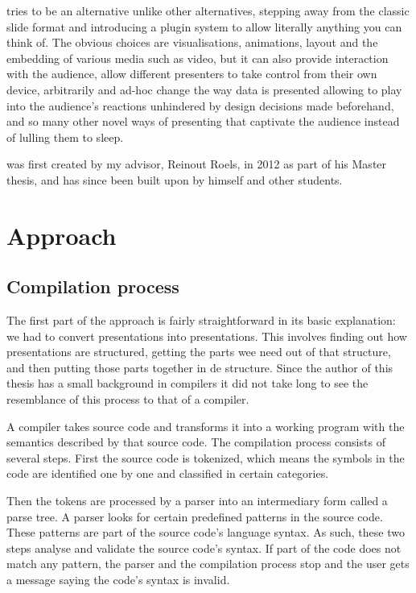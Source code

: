 \documentclass[a4paper,12pt]{report}
\begin{document}


    \mxp tries to be an alternative unlike other alternatives, stepping away
    from the classic slide format and introducing a plugin system to allow
    literally anything you can think of. The obvious choices are
    visualisations, animations, layout and the embedding of various media such
    as video, but it can also provide interaction with the audience, allow
    different presenters to take control from their own device, arbitrarily and
    ad-hoc change the way data is presented allowing to play into the
    audience's reactions unhindered by design decisions made beforehand, and so
    many other novel ways of presenting that captivate the audience instead of
    lulling them to sleep.

    \mxp was first created by my advisor, Reinout Roels, in 2012 as part of his
    Master thesis, and has since been built upon by himself and other students.


 \chapter{Approach}

  \section{Compilation process}

   The first part of the approach is fairly straightforward in its basic
   explanation: we had to convert \ppt presentations into \mxp presentations.
   This involves finding out how \ppt presentations are structured, getting the
   parts wee need out of that structure, and then putting those parts together
   in de \mxp structure. Since the author of this thesis has a small background
   in compilers \citep{vandermeersch-1} it did not take long to see the
   resemblance of this process to that of a compiler.

   A compiler takes source code and transforms it into a working program with
   the semantics described by that source code. The compilation process
   consists of several steps. First the source code is tokenized, which means
   the symbols in the code are identified one by one and classified in certain
   categories.

   Then the tokens are processed by a parser into an intermediary form called a
   parse tree. A parser looks for certain predefined patterns in the source
   code. These patterns are part of the source code's language syntax. As such,
   these two steps analyse and validate the source code's syntax. If part of
   the code does not match any pattern, the parser and the compilation process
   stop and the user gets a message saying the code's syntax is invalid.
\end{document}
